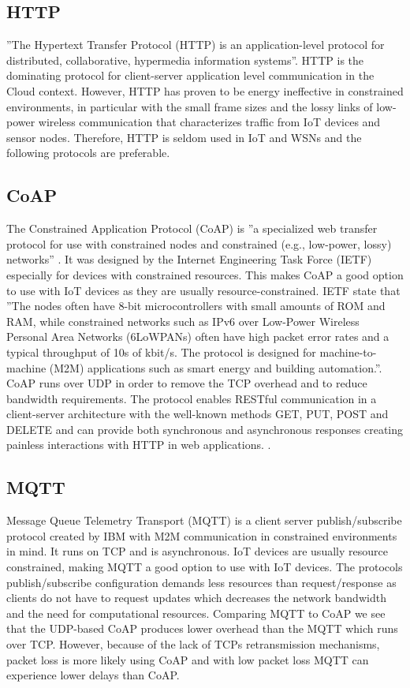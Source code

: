 \documentclass[]{uiophd}
\begin{document}
\subsection{HTTP}
 
''The Hypertext Transfer Protocol (HTTP) is an application-level protocol for distributed, collaborative, hypermedia information systems''\parencite{HTTP1996}. HTTP is the dominating protocol for client-server application level communication in the Cloud context. However, HTTP has proven to be energy ineffective in constrained environments, in particular with the small frame sizes and the lossy links of low-power wireless communication that characterizes traffic from IoT devices and sensor nodes\parencite{karagiannis2015survey}\parencite{7030106}. Therefore, HTTP is seldom used in IoT and WSNs and the following protocols are preferable.

\subsection{CoAP}
The Constrained Application Protocol (CoAP) is ''a specialized web transfer protocol for use with constrained nodes and constrained (e.g., low-power, lossy) networks'' \parencite{rfc7252}. It was designed by the Internet Engineering Task Force (IETF) especially for devices with constrained resources. This makes CoAP a good option to use with IoT devices as they are usually resource-constrained. IETF state that ''The nodes often have 8-bit microcontrollers with small amounts of ROM and RAM, while constrained networks such as IPv6 over Low-Power Wireless Personal Area Networks (6LoWPANs) often have high packet error rates and a typical throughput of 10s of kbit/s.  The protocol is designed for machine-to-machine (M2M) applications such as smart energy and building automation.''\parencite{rfc7252}. CoAP runs over UDP in order to remove the TCP overhead and to reduce bandwidth requirements. The protocol enables RESTful communication in a client-server architecture with the well-known methods GET, PUT, POST and DELETE and can provide both synchronous and asynchronous responses creating painless interactions with HTTP in web applications.
\parencite{rfc7252}
\parencite{karagiannis2015survey}
\parencite{7030106}.

\subsection{MQTT}
Message Queue Telemetry Transport (MQTT) is a client server publish/subscribe protocol created by IBM with M2M communication in constrained environments in mind. It runs on TCP and is asynchronous. IoT devices are usually resource constrained, making MQTT a good option to use with IoT devices. The protocols publish/subscribe configuration demands less resources than request/response as clients do not have to request updates which decreases the network bandwidth and the need for computational resources. Comparing MQTT to CoAP we see that the UDP-based CoAP produces lower overhead than the MQTT which runs over TCP. However, because of the lack of TCPs retransmission mechanisms, packet loss is more likely using CoAP and with low packet loss MQTT can experience lower delays than CoAP\parencite{karagiannis2015survey}.
\end{document}
